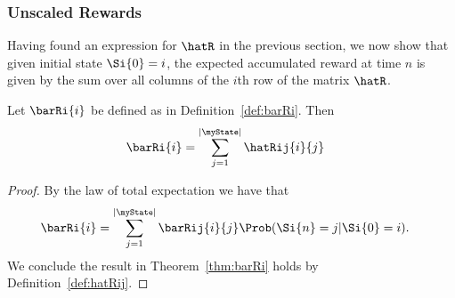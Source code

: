 \subsubsection{Unscaled Rewards}
\label{subsec:unscaled_rewards}





Having found an expression for $\hatR$ in the previous section, we now show that given initial state $\Si{0} = i$, the expected accumulated reward at time $n$ is given by the sum over all columns of the $i$th row of the matrix $\hatR$.

\begin{theorem}
\label{thm:barRi}
	Let $\barRi{i}$ be defined as in Definition~\ref{def:barRi}.  Then
\begin{align}
	\barRi{i} &=  \sum_{j = 1}^{|\myState|} \hatRij{i}{j}
\end{align}	
\end{theorem}
\begin{proof}
	By the law of total expectation we have that 
	\setcounter{cnt}{1}
	\begin{align}
		\barRi{i} &= \sum_{j = 1}^{|\myState|} \barRij{i}{j} \Prob(\Si{n} = j | \Si{0} = i).
	\end{align}
	We conclude the result in Theorem~\ref{thm:barRi} holds by Definition~\ref{def:hatRij}.
\end{proof}

